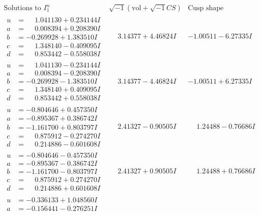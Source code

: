 \documentclass[1p]{elsarticle_modified}
\theoremstyle{definition}
\newcommand{\I}{\sqrt{-1}}
\begin{document}
$$\begin{array}{c|c|c}  
\text{Solutions to }I^u_{1}& \I (\text{vol} + \sqrt{-1}CS) & \text{Cusp shape}\\
 \hline 
\begin{aligned}
u &= \phantom{-}1.041130 + 0.234144 I \\
a &= \phantom{-}0.008394 + 0.208390 I \\
b &= -0.269928 + 1.383510 I \\
c &= \phantom{-}1.348140 - 0.409095 I \\
d &= \phantom{-}0.853442 - 0.558038 I\end{aligned}
 & \phantom{-}3.14377 + 4.46824 I & -1.00511 - 6.27335 I \\ \hline\begin{aligned}
u &= \phantom{-}1.041130 - 0.234144 I \\
a &= \phantom{-}0.008394 - 0.208390 I \\
b &= -0.269928 - 1.383510 I \\
c &= \phantom{-}1.348140 + 0.409095 I \\
d &= \phantom{-}0.853442 + 0.558038 I\end{aligned}
 & \phantom{-}3.14377 - 4.46824 I & -1.00511 + 6.27335 I \\ \hline\begin{aligned}
u &= -0.804646 + 0.457350 I \\
a &= -0.895367 + 0.386742 I \\
b &= -1.161700 + 0.803797 I \\
c &= \phantom{-}0.875912 - 0.274270 I \\
d &= \phantom{-}0.214886 - 0.601608 I\end{aligned}
 & \phantom{-}2.41327 - 0.90505 I & \phantom{-}1.24488 - 0.76686 I \\ \hline\begin{aligned}
u &= -0.804646 - 0.457350 I \\
a &= -0.895367 - 0.386742 I \\
b &= -1.161700 - 0.803797 I \\
c &= \phantom{-}0.875912 + 0.274270 I \\
d &= \phantom{-}0.214886 + 0.601608 I\end{aligned}
 & \phantom{-}2.41327 + 0.90505 I & \phantom{-}1.24488 + 0.76686 I \\ \hline\begin{aligned}
u &= -0.336133 + 1.048560 I \\
a &= -0.156441 - 0.276251 I \\

\end{aligned}
\end{array}$$
\end{document}

